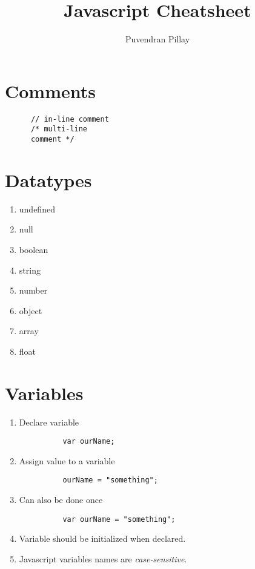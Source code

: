 \documentclass{article}
\title{Javascript Cheatsheet}
\author{Puvendran Pillay}
\begin{document}
  \maketitle
  \section{Comments}
    \begin{lstlisting}
      // in-line comment
      /* multi-line
      comment */
    \end{lstlisting}
  \section{Datatypes}
    \begin{enumerate}
      \item undefined
      \item  null
      \item  boolean
      \item  string
      \item  number
      \item  object
      \item  array
      \item  float
    \end{enumerate}
  \section{Variables}
    \begin{enumerate}
      \item Declare variable
        \begin{lstlisting}
          var ourName;
        \end{lstlisting}
      \item Assign value to a variable
        \begin{lstlisting}
          ourName = "something";
        \end{lstlisting}
      \item Can also be done once
        \begin{lstlisting}
          var ourName = "something";
        \end{lstlisting}
        \item Variable should be initialized when declared.
        \item Javascript variables names are \emph{case-sensitive}.
    \end{enumerate}
\end{document}
